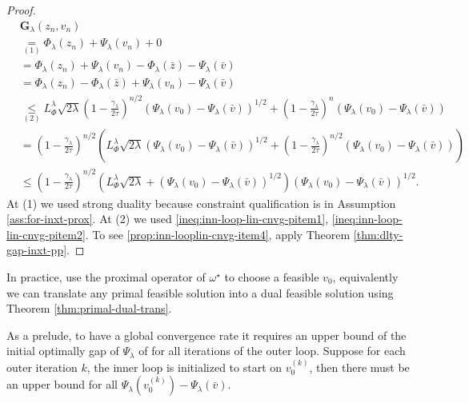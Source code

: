 \documentclass[12pt]{article}
\begin{document}
\begin{proof}
            \begin{align*}
                & \mathbf G_\lambda(z_n, v_n) 
                \\
                &\underset{(1)}{=} \Phi_\lambda(z_n) + \Psi_\lambda(v_n) + 0
                \\
                &= \Phi_\lambda(z_n) + \Psi_\lambda(v_n) - \Phi_\lambda(\bar z) - \Psi_\lambda(\bar v)
                \\
                &= \Phi_\lambda(z_n)- \Phi_\lambda(\bar z) + \Psi_\lambda(v_n) - \Psi_\lambda(\bar v)
                \\
                &\underset{(2)}{\le} 
                L_\Phi^\lambda \sqrt{2\lambda}\left(
                    1 - \frac{\gamma_\lambda}{2\tau}
                \right)^{n/2}\left(
                    \Psi_\lambda(v_0) - \Psi_\lambda(\bar v)
                \right)^{1/2}
                + \left(
                    1 - \frac{\gamma_\lambda}{2\tau}
                \right)^{n}\left(
                    \Psi_\lambda(v_0) - \Psi_\lambda(\bar v)
                \right)
                \\
                &= \left(
                    1 - \frac{\gamma_\lambda}{2\tau}
                \right)^{n/2}\left(
                    L_\Phi^\lambda \sqrt{2\lambda}\left(
                        \Psi_\lambda(v_0) - \Psi_\lambda(\bar v)
                    \right)^{1/2} 
                    + 
                    \left(
                        1 - \frac{\gamma_\lambda}{2\tau}
                    \right)^{n/2} (\Psi_\lambda(v_0) - \Psi_\lambda(\bar v))
                \right)
                \\
                &\le 
                \left(
                    1 - \frac{\gamma_\lambda}{2\tau}
                \right)^{n/2}\left(
                    L_\Phi^\lambda \sqrt{2\lambda}
                    + 
                    (\Psi_\lambda(v_0) - \Psi_\lambda(\bar v))^{1/2}
                \right)
                \left(
                        \Psi_\lambda(v_0) - \Psi_\lambda(\bar v)
                    \right)^{1/2} . 
            \end{align*}
            At (1) we used strong duality because constraint qualification is in Assumption \ref{ass:for-inxt-prox}. 
            At (2) we used \eqref{ineq:inn-loop-lin-cnvg-pitem1}, \eqref{ineq:inn-loop-lin-cnvg-pitem2}. 
            To see \ref{prop:inn-looplin-cnvg-item4}, apply Theorem \ref{thm:dlty-gap-inxt-pp}. 
        \end{proof}
        \begin{remark}
            In practice, use the proximal operator of $\omega^\star$ to choose a feasible $v_0$, equivalently we can translate any primal feasible solution into a dual feasible solution using Theorem \ref{thm:primal-dual-trans}. 
            \par
            As a prelude, to have a global convergence rate it requires an upper bound of the initial optimally gap of $\Psi_\lambda$ of for all iterations of the outer loop. 
            Suppose for each outer iteration $k$, the inner loop is initialized to start on $v_0^{(k)}$, then there must be an upper bound for all $\Psi_\lambda\left(v_0^{(k)}\right) - \Psi_\lambda(\bar v)$. 
        \end{remark}
\end{document}
